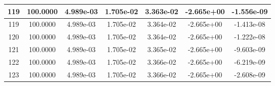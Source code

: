 \documentclass[10pt]{report}
\begin{document}
\begin{table}[H]
\begin{center}
\begin{tabular}{|c|c|c|c|c|c|c|}
119 & 100.0000 & 4.989e-03 & 1.705e-02 & 3.363e-02 & -2.665e+00 & -1.556e-09\\ \hline
119 & 100.0000 & 4.989e-03 & 1.705e-02 & 3.364e-02 & -2.665e+00 & -1.413e-08\\ \hline
120 & 100.0000 & 4.989e-03 & 1.705e-02 & 3.364e-02 & -2.665e+00 & -1.222e-08\\ \hline
121 & 100.0000 & 4.989e-03 & 1.705e-02 & 3.365e-02 & -2.665e+00 & -9.603e-09\\ \hline
122 & 100.0000 & 4.989e-03 & 1.705e-02 & 3.366e-02 & -2.665e+00 & -6.219e-09\\ \hline
123 & 100.0000 & 4.989e-03 & 1.705e-02 & 3.366e-02 & -2.665e+00 & -2.608e-09\\ \hline
\end{tabular}
\end{center}
\end{table}
\end{document}
